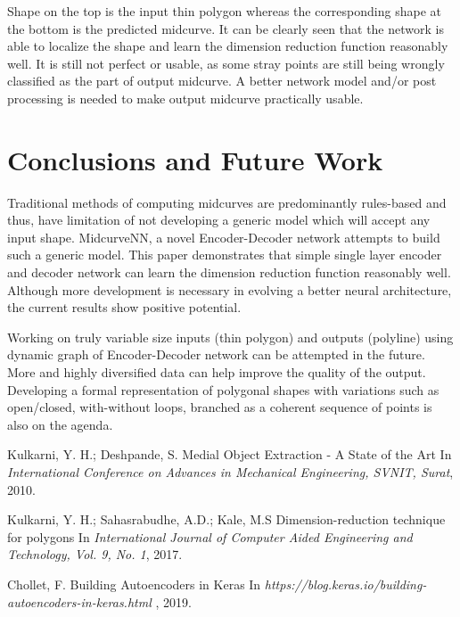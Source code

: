 \documentclass[10pt,twocolumn,letterpaper]{article}
\begin{document}
Shape on the top is the input thin polygon whereas the corresponding shape at the bottom is the predicted midcurve. It can be clearly seen that the network is able to localize the shape and learn the dimension reduction function reasonably well. It is still not perfect or usable, as some stray points are still being wrongly classified as the part of output midcurve. A better network model and/or post processing is needed to make output midcurve practically usable.

\section{Conclusions and Future Work}

Traditional methods of computing midcurves are predominantly rules-based and thus, have limitation of not developing a generic model which will accept any input shape. MidcurveNN, a novel Encoder-Decoder network attempts to build such a generic model. This paper demonstrates that simple single layer encoder and decoder network can learn the dimension reduction function reasonably well. Although more development is necessary in evolving a better neural architecture, the current results show positive potential. 

Working on truly variable size inputs (thin polygon) and outputs (polyline) using dynamic graph of Encoder-Decoder network can be attempted in the future. More and highly diversified data can help improve the quality of the output. Developing a formal representation of polygonal shapes with variations such as open/closed, with-without loops, branched as a coherent sequence of points is also on the agenda.


{\small

% 
\begin{thebibliography}{1}

Kulkarni, Y. H.; Deshpande, S.
\newblock Medial Object Extraction - A State of the Art
\newblock In {\em International Conference on Advances in Mechanical Engineering, SVNIT, Surat}, 2010.

Kulkarni, Y. H.; Sahasrabudhe, A.D.; Kale, M.S
\newblock Dimension-reduction technique for polygons
\newblock In {\em International Journal of Computer Aided Engineering and Technology, Vol. 9, No. 1}, 2017.

Chollet, F.
\newblock Building Autoencoders in Keras
\newblock In {\em https://blog.keras.io/building-autoencoders-in-keras.html }, 2019.

\end{thebibliography}
}
\end{document}
